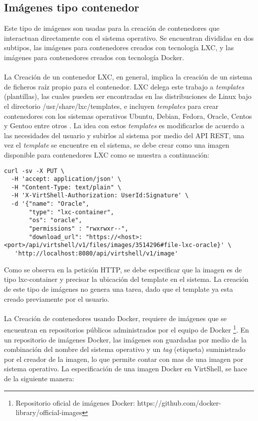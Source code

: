 \subsection{Imágenes tipo contenedor}
Este tipo de imágenes son usadas para la creación de contenedores que interactuan directamente con el sistema operativo. Se encuentran divididas en dos subtipos, las imágenes para contenedores creados con tecnología LXC, y las imágenes para contenedores creados con tecnología Docker.\\
\\
La Creación de un contenedor LXC, en general, implica la creación de un sistema de ficheros raíz propio para el contenedor. LXC delega este trabajo a \emph{templates} (plantillas), las cuales pueden ser encontradas en las distribuciones de Linux bajo el directorio /usr/share/lxc/templates, e incluyen \emph{templates} para crear contenedores con los sistemas operativos Ubuntu, Debian, Fedora, Oracle, Centos y Gentoo entre otros \cite{lxcubuntu16}. La idea con estos \emph{templates} es modificarlos de acuerdo a las necesidades del usuario y subirlos al sistema por medio del API REST,  una vez el \emph{template} se encuentre en el sistema, se debe crear como una imagen disponible para contenedores LXC como se muestra a continuación:

\vspace{5mm}

\begin{lstlisting}[style=json, caption=Petición HTTP para crear una imagen para contenedores LXC]
curl -sv -X PUT \
  -H 'accept: application/json' \
  -H "Content-Type: text/plain" \
  -H 'X-VirtShell-Authorization: UserId:Signature' \
  -d '{"name": "Oracle",
       "type": "lxc-container",
       "os": "oracle",
       "permissions" : "rwxrwxr--",
       "download_url": "https://<host>:<port>/api/virtshell/v1/files/images/3514296#file-lxc-oracle}' \
   'http://localhost:8080/api/virtshell/v1/image'
\end{lstlisting}

\vspace{5mm}

Como se observa en la petición HTTP, se debe especificar que la imagen es de tipo lxc-container y precisar la ubicación del template en el sistema. La creación de este tipo de imágenes no genera una tarea, dado que el template ya esta creado previamente por el usuario.\\
\\
La Creación de contenedores usando Docker, requiere de imágenes que se encuentran en repositorios públicos administrados por el equipo de Docker \footnote{Repositorio oficial de imágenes Docker: https://github.com/docker-library/official-images}. En un repositorio de imágenes Docker, las imágenes son guardadas por medio de la combinación del nombre del sistema operativo y un \emph{tag} (etiqueta) suministrado por el creador de la imagen, lo que permite contar con mas de una imagen por sistema operativo. La especificación de una imagen Docker en VirtShell, se hace de la siguiente manera:

